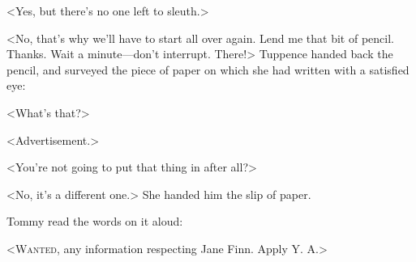 <Yes, but there's no one left to sleuth.>

<No, that's why we'll have to start all over again. Lend me that bit of pencil. Thanks. Wait a minute—don't interrupt. There!> Tuppence handed back the pencil, and surveyed the piece of paper on which she had written with a satisfied eye:

<What's that?>

<Advertisement.>

<You're not going to put that thing in after all?>

<No, it's a different one.> She handed him the slip of paper.

Tommy read the words on it aloud:

<\textsc{Wanted,} any information respecting Jane Finn. Apply Y. A.> 